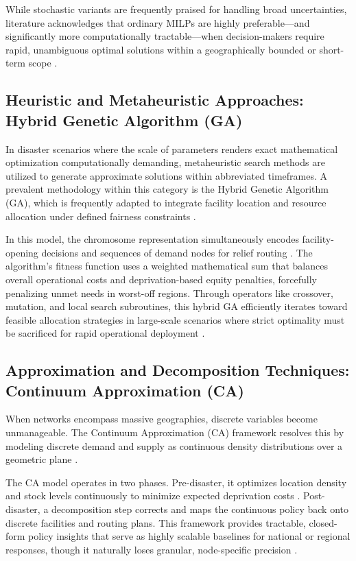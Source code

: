 While stochastic variants are frequently praised for handling broad uncertainties, literature acknowledges that ordinary MILPs are highly preferable—and significantly more computationally tractable—when decision-makers require rapid, unambiguous optimal solutions within a geographically bounded or short-term scope \cite{albadi2024, manggasa2020}.

\subsection{Heuristic and Metaheuristic Approaches: Hybrid Genetic Algorithm (GA)}
In disaster scenarios where the scale of parameters renders exact mathematical optimization computationally demanding, metaheuristic search methods are utilized to generate approximate solutions within abbreviated timeframes. A prevalent methodology within this category is the Hybrid Genetic Algorithm (GA), which is frequently adapted to integrate facility location and resource allocation under defined fairness constraints \cite{moreno2018effective, changshi2019location}.

In this model, the chromosome representation simultaneously encodes facility-opening decisions and sequences of demand nodes for relief routing \cite{changshi2019location}. The algorithm’s fitness function uses a weighted mathematical sum that balances overall operational costs and deprivation-based equity penalties, forcefully penalizing unmet needs in worst-off regions. Through operators like crossover, mutation, and local search subroutines, this hybrid GA efficiently iterates toward feasible allocation strategies in large-scale scenarios where strict optimality must be sacrificed for rapid operational deployment \cite{farahani2020mass, moreno2018effective}.

\subsection{Approximation and Decomposition Techniques: Continuum Approximation (CA)}
When networks encompass massive geographies, discrete variables become unmanageable. The Continuum Approximation (CA) framework resolves this by modeling discrete demand and supply as continuous density distributions over a geometric plane \cite{jiang2019emergency}.

The CA model operates in two phases. Pre-disaster, it optimizes location density and stock levels continuously to minimize expected deprivation costs \cite{fazli2021location}. Post-disaster, a decomposition step corrects and maps the continuous policy back onto discrete facilities and routing plans. This framework provides tractable, closed-form policy insights that serve as highly scalable baselines for national or regional responses, though it naturally loses granular, node-specific precision \cite{fazli2021location, jiang2019emergency}.

